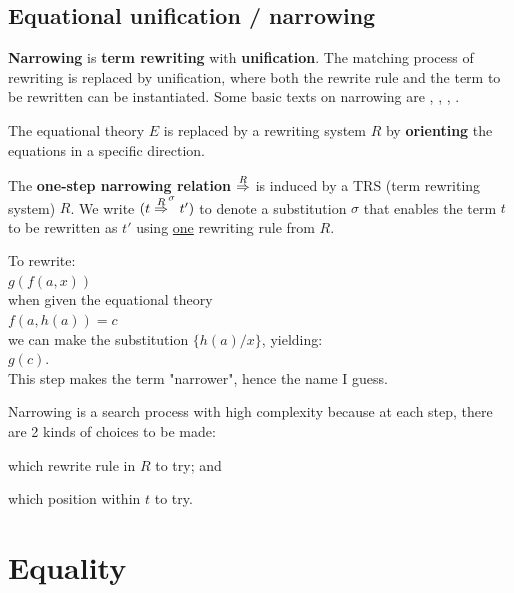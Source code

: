 \underconst

\subsection{Equational unification / narrowing}
\label{sec:narrowing}

\textbf{Narrowing} is \textbf{term rewriting} with \textbf{unification}.  The matching process of rewriting is replaced by unification, where both the rewrite rule and the term to be rewritten can be instantiated.  Some basic texts on narrowing are \citep*{Baader1998}, \citep*{Snyder1991}, \citep*{Prehofer1998}, \citep*{Holldobler1989}.

The equational theory $E$ is replaced by a rewriting system $R$ by \textbf{orienting} the equations in a specific direction.

The \textbf{one-step narrowing relation} $\stackrel{R}{\Rightarrow}$ is induced by a TRS (term rewriting system) $R$.  We write $(t \stackrel{R}{\Rightarrow}^\sigma t')$ to denote a substitution $\sigma$ that enables the term $t$ to be rewritten as $t'$ using \underline{one} rewriting rule from $R$. \\


\begin{example}
To rewrite:\\
\tab $g(f(a,x))$ \\
when given the equational theory\\
\tab $f(a, h(a)) = c$ \\
we can make the substitution $\{ h(a) / x \}$, yielding:\\
\tab $g(c)$. \\
This step makes the term "narrower", hence the name I guess.
\end{example}

Narrowing is a search process with high complexity because at each step, there are 2 kinds of choices to be made:
\begin{compactenum-}
\item which rewrite rule in $R$ to try; and
\item which position within $t$ to try.
\end{compactenum-}

\section{Equality}
  
\label{sec:equality}

